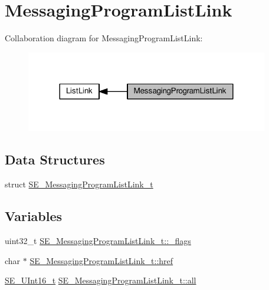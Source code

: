 \hypertarget{group__MessagingProgramListLink}{}\section{Messaging\+Program\+List\+Link}
\label{group__MessagingProgramListLink}
Collaboration diagram for Messaging\+Program\+List\+Link\+:\nopagebreak
\begin{figure}[H]
\begin{center}
\leavevmode
\includegraphics[width=300pt]{group__MessagingProgramListLink}
\end{center}
\end{figure}
\subsection*{Data Structures}
\begin{DoxyCompactItemize}
\item 
struct \hyperlink{structSE__MessagingProgramListLink__t}{S\+E\+\_\+\+Messaging\+Program\+List\+Link\+\_\+t}
\end{DoxyCompactItemize}
\subsection*{Variables}
\begin{DoxyCompactItemize}
\item 
uint32\+\_\+t \hyperlink{group__MessagingProgramListLink_gacaf8f61da354e26c709cf070f085c9ac}{S\+E\+\_\+\+Messaging\+Program\+List\+Link\+\_\+t\+::\+\_\+flags}
\item 
char $\ast$ \hyperlink{group__MessagingProgramListLink_ga9de2a5b8c7445491974f50c066dd63ee}{S\+E\+\_\+\+Messaging\+Program\+List\+Link\+\_\+t\+::href}
\item 
\hyperlink{group__UInt16_gac68d541f189538bfd30cfaa712d20d29}{S\+E\+\_\+\+U\+Int16\+\_\+t} \hyperlink{group__MessagingProgramListLink_ga6995e02d8ec9a63b3ead9a04addff2d9}{S\+E\+\_\+\+Messaging\+Program\+List\+Link\+\_\+t\+::all}
\end{DoxyCompactItemize}


